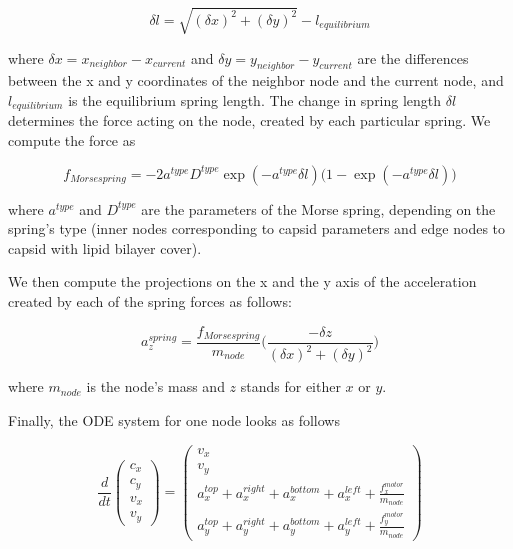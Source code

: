 \begin{equation}
\delta l = \sqrt{(\delta x)^2 + (\delta y)^2} - l_{equilibrium}
\end{equation}

where $\delta x = x_{neighbor} - x_{current}$ and $\delta y = y_{neighbor} - y_{current}$ are the differences between the x and y coordinates of the neighbor node and the current node, and $l_{equilibrium}$ is the equilibrium spring length. The change in spring length $\delta l$ determines the force acting on the node, created by each particular spring. We compute the force as

\begin{equation}
f_{Morse spring} = -2 a^{type} D^{type} \exp(-a^{type} \delta l) \big(1 - \exp(-a^{type} \delta l)\big)
\end{equation}
 
where $a^{type}$ and $D^{type}$ are the parameters of the Morse spring, depending on the spring’s type (inner nodes corresponding to capsid parameters and edge nodes to capsid with lipid bilayer cover).

We then compute the projections on the x and the y axis of the acceleration created by each of the spring forces as follows:

\begin{equation}
a^{spring}_z = \frac{f_{Morse spring}}{m_{node}} \Big(\frac{-\delta z}{(\delta x)^2 + (\delta y)^2}\Big)
\end{equation}

where $m_{node}$ is the node’s mass and $z$ stands for either $x$ or $y$.

Finally, the ODE system for one node looks as follows

\begin{equation}
\frac{d}{dt}
\begin{pmatrix}
c_x\\
c_y\\
v_x\\
v_y
\end{pmatrix}
=
\begin{pmatrix}
v_x\\
v_y\\
a^{top}_x + a^{right}_x + a^{bottom}_x + a^{left}_x + \frac{f^{motor}_x}{m_{node}}\\
a^{top}_y + a^{right}_y + a^{bottom}_y + a^{left}_y + \frac{f^{motor}_y}{m_{node}}
\end{pmatrix}
\end{equation}

